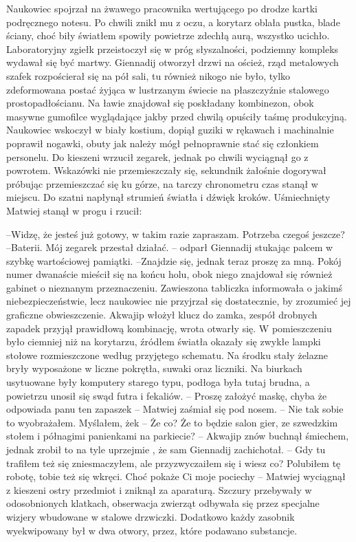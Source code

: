 \documentclass[../MAIN.tex]{subfiles}
\begin{document}
Naukowiec spojrzał na żwawego pracownika wertującego po drodze kartki podręcznego notesu. Po chwili znikł mu z oczu, a korytarz oblała pustka, blade ściany, choć biły światłem spowiły powietrze zdechłą aurą, wszystko ucichło. Laboratoryjny zgiełk przeistoczył się w próg słyszalności, podziemny kompleks wydawał się być martwy. Giennadij otworzył drzwi na oścież, rząd metalowych szafek rozpościerał się na pół sali, tu również nikogo nie było, tylko zdeformowana postać żyjąca w lustrzanym świecie na płaszczyźnie stalowego prostopadłościanu. Na ławie znajdował się poskładany kombinezon, obok masywne gumofilce wyglądające jakby przed chwilą opuściły taśmę produkcyjną. Naukowiec wskoczył w biały kostium, dopiął guziki w rękawach i machinalnie poprawił nogawki, obuty jak należy mógł pełnoprawnie stać się członkiem personelu. Do kieszeni wrzucił zegarek, jednak po chwili wyciągnął go z powrotem. Wskazówki nie przemieszczały się, sekundnik żałośnie dogorywał próbując przemieszczać się ku górze, na tarczy chronometru czas stanął w miejscu. Do szatni napłynął strumień światła i dźwięk kroków. Uśmiechnięty Matwiej stanął w progu i rzucił: 

--Widzę, że jesteś już gotowy, w takim razie zapraszam. Potrzeba czegoś jeszcze? 
--Baterii. Mój zegarek przestał działać. -- odparł Giennadij stukając palcem w szybkę wartościowej pamiątki. 
--Znajdzie się, jednak teraz proszę za mną. 
Pokój numer dwanaście mieścił się na końcu holu, obok niego znajdował się również gabinet o nieznanym przeznaczeniu. Zawieszona tabliczka informowała o jakimś niebezpieczeństwie, lecz naukowiec nie przyjrzał się dostatecznie, by zrozumieć jej graficzne obwieszczenie. Akwajip włożył klucz do zamka, zespół drobnych zapadek przyjął prawidłową kombinację, wrota otwarły się. W pomieszczeniu było ciemniej niż na korytarzu, źródłem światła okazały się zwykłe lampki stołowe rozmieszczone według przyjętego schematu. Na środku stały żelazne bryły wyposażone w liczne pokrętła, suwaki oraz liczniki. Na biurkach usytuowane były komputery starego typu, podłoga była tutaj brudna, a powietrzu unosił się swąd futra i fekaliów. 
-- Proszę założyć maskę, chyba że odpowiada panu ten zapaszek -- Matwiej zaśmiał się pod nosem. 
-- Nie tak sobie to wyobrażałem. Myślałem, że\3k 
-- Że co? Że to będzie salon gier, ze szwedzkim stołem i półnagimi panienkami na parkiecie? -- Akwajip znów buchnął śmiechem, jednak zrobił to na tyle uprzejmie , że sam Giennadij zachichotał. 
-- Gdy tu trafiłem też się zniesmaczyłem, ale przyzwyczaiłem się i wiesz co? Polubiłem tę robotę, tobie też się wkręci. Choć pokaże Ci moje pociechy -- Matwiej wyciągnął z kieszeni ostry przedmiot i zniknął za aparaturą. 
Szczury przebywały w odosobnionych klatkach, obserwacja zwierząt odbywała się przez specjalne wizjery wbudowane w stalowe drzwiczki. Dodatkowo każdy zasobnik wyekwipowany był w dwa otwory, przez, które podawano substancje. 
\end{document}

